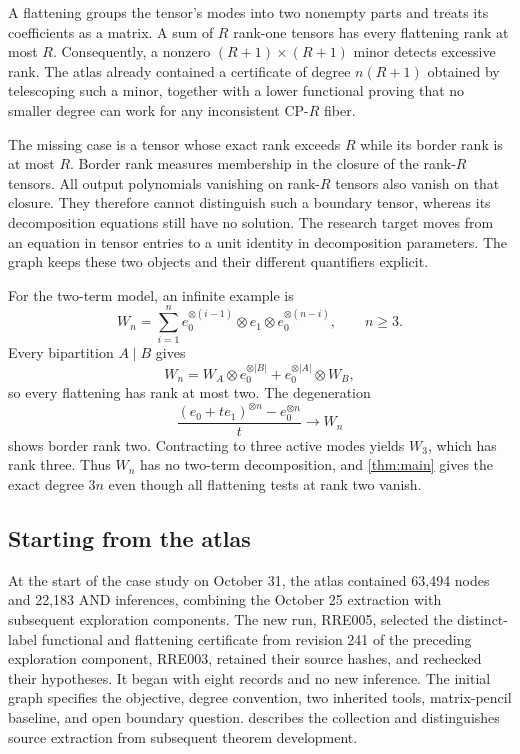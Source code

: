 A flattening groups the tensor's modes into two nonempty parts and treats its coefficients as a matrix. A sum of $R$ rank-one tensors has every flattening rank at most $R$. Consequently, a nonzero $(R+1)\times(R+1)$ minor detects excessive rank. The atlas already contained a certificate of degree $n(R+1)$ obtained by telescoping such a minor, together with a lower functional proving that no smaller degree can work for any inconsistent CP-$R$ fiber.

The missing case is a tensor whose exact rank exceeds $R$ while its border rank is at most $R$. Border rank measures membership in the closure of the rank-$R$ tensors. All output polynomials vanishing on rank-$R$ tensors also vanish on that closure. They therefore cannot distinguish such a boundary tensor, whereas its decomposition equations still have no solution. The research target moves from an equation in tensor entries to a unit identity in decomposition parameters. The graph keeps these two objects and their different quantifiers explicit.

For the two-term model, an infinite example is
\begin{equation}\label{eq:wn}
 W_n=\sum_{i=1}^{n}e_0^{\otimes(i-1)}\otimes e_1
                  \otimes e_0^{\otimes(n-i)},\qquad n\ge3.
\end{equation}
Every bipartition $A\mid B$ gives
\[
 W_n=W_A\otimes e_0^{\otimes |B|}
       +e_0^{\otimes |A|}\otimes W_B,
\]
so every flattening has rank at most two. The degeneration
\[
 \frac{(e_0+t e_1)^{\otimes n}-e_0^{\otimes n}}{t}
       \longrightarrow W_n
\]
shows border rank two. Contracting to three active modes yields $W_3$, which has rank three. Thus $W_n$ has no two-term decomposition, and \cref{thm:main} gives the exact degree $3n$ even though all flattening tests at rank two vanish.

\subsection{Starting from the atlas}

At the start of the case study on October 31, the atlas contained 63,494 nodes and 22,183 AND inferences, combining the October 25 extraction with subsequent exploration components. The new run, RRE005, selected the distinct-label functional and flattening certificate from revision 241 of the preceding exploration component, RRE003, retained their source hashes, and rechecked their hypotheses. It began with eight records and no new inference. The initial graph specifies the objective, degree convention, two inherited tools, matrix-pencil baseline, and open boundary question.  describes the collection and distinguishes source extraction from subsequent theorem development.

